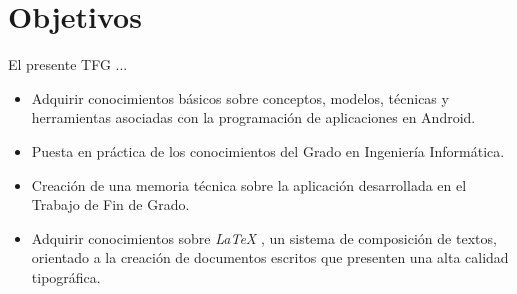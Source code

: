 %
%
%
%

\chapter{Objetivos} \label{chap:objetives}  

El presente TFG ...

\begin{itemize}
\item Adquirir conocimientos básicos sobre conceptos, modelos, técnicas y herramientas asociadas con la programación de aplicaciones en Android.
\item Puesta en práctica de los conocimientos del Grado en Ingeniería Informática.
\item Creación de una memoria técnica sobre la aplicación desarrollada en el Trabajo de Fin de Grado.
\item Adquirir conocimientos sobre \textit{LaTeX} \cite{URL::LaTeX}, un sistema de composición de textos, orientado a la creación de documentos escritos 
que presenten una alta calidad tipográfica.
\end{itemize}
